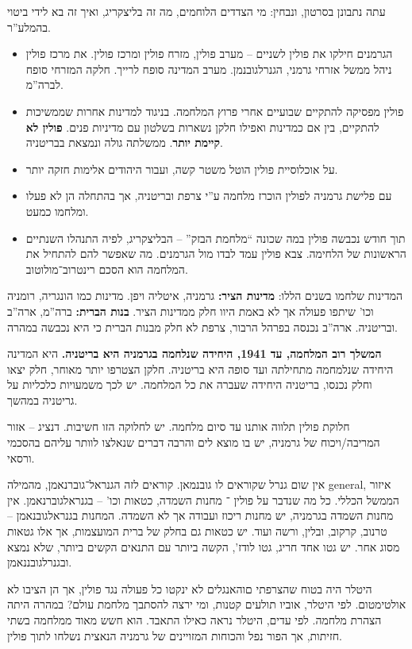 \documentclass[a4paper]{book}
\begin{document}
	עתה נתבונן בסרטון, ונבחין: מי הצדדים הלוחמים, מה זה בליצקריג, ואיך זה בא לידי ביטוי בהמלע''ר. 
	\begin{itemize}
		\item הגרמנים חילקו את פולין לשניים – מערב פולין, מזרח פולין ומרכז פולין. את מרכז פולין ניהל ממשל אזרחי גרמני, הגנרלגובנמן. מערב המדינה סופח לרייך. חלקה המזרחי סופח לברה''מ. 
		\item פולין מפסיקה להתקיים שבועיים אחרי פרוץ המלחמה. בניגוד למדינות אחרות שממשיכות להתקיים, בין אם כמדינות ואפילו חלקן נשארות בשלטון עם מדיניות פנים. \textbf{פולין לא קיימת יותר}. ממשלתה גולה ונמצאת בבריטניה. 
		\item על אוכלוסיית פולין הוטל משטר קשה, ועבור היהודים אלימות חזקה יותר. 
		\item עם פלישת גרמניה לפולין הוכרז מלחמה ע''י צרפת ובריטניה, אך בהתחלה הן לא פעלו ומלחמו כמעט. 
		\item תוך חודש נכבשה פולין במה שכונה ``מלחמת הבזק'' – הבליצקריג, לפיה התנהלו השנתיים הראשונות של הלחימה. צבא פולין עמד לבדו מול הגרמנים. מה שאפשר להם להתחיל את המלחמה הוא הסכם רינטרוב־מולוטוב. 
	\end{itemize}
	המדינות שלחמו בשנים הללו: \textbf{מדינות הציר: }גרמניה, איטליה ויפן. מדינות כמו הונגריה, רומניה וכו' שיתפו פעולה אך לא באמת היוו חלק ממדינות הציר. \textbf{בנות הברית: }ברה''מ, ארה''ב ובריטניה. ארה''ב נכנסה בפרהל הרבור, צרפת לא חלק מבנות הברית כי היא נכבשה במהרה. 
	
	\textbf{המשלך רוב המלחמה, עד 1941, היחידה שנלחמה בגרמניה היא בריטניה. }היא המדינה היחידה שנלמחמה מתחילתה ועד סופה היא בריטניה. חלקן הצטרפו יותר מאוחר, חלק יצאו וחלק נכנסו, בריטניה היחידה שעברה את כל המלחמה. יש לכך משמעויות כלכליות על גריטניה במהשך. 
	
	חלוקת פולין תלווה אותנו עד סיום מלחמה. יש לחלוקה הזו חשיבות. דנציג – אזור המריבה/ויכוח של גרמניה, יש בו מוצא לים והרבה דברים שנאלצו לוותר עליהם בהסכמי ורסאי. 
	
	אין שום גנרל שקוראים לו גובנמאן. קוראים לזה הגנראל־גוברנאמן, מהמילה general, איזור הממשל הכללי. כל מה שנדבר על פולין ־ מחנות השמדה, כטאות וכו' – בגנראלגוברנאמן. אין מחנות השמדה בגרמניה, יש מחנות ריכוז ועבודה אך לא השמדה. המחנות בגנראלגובנאמן  –טרנוב, קרקוב, ובלין, ורשה ועוד. יש כטאות גם בחלק של ברית המועצמות, אך אלו גטאות מסוג אחר. יש גטו אחד חריג, גטו לודז', הקשה ביותר עם התנאים הקשים ביותר, שלא נמצא ובגנרלגובננאמן. 
	
	היטלר היה בטוח שהצרפתי םוהאנגלים לא ינקטו כל פעולה נגד פולין, אך הן הציבו לא אולטימטום. לפי היטלר, אוביו תולעים קטנות, ומי ירצה להסתבך מלחמת עולם? במהרה היתה הצהרת מלחמה. לפי עדים, היטלר נראה כאילו התאבד. הוא חשש מאוד ממלחמה בשתי חזיתות, אך הפור נפל והכוחות המזויינים של גרמניה הנאצית נשלחו לתוך פולין. 
	
\end{document}
